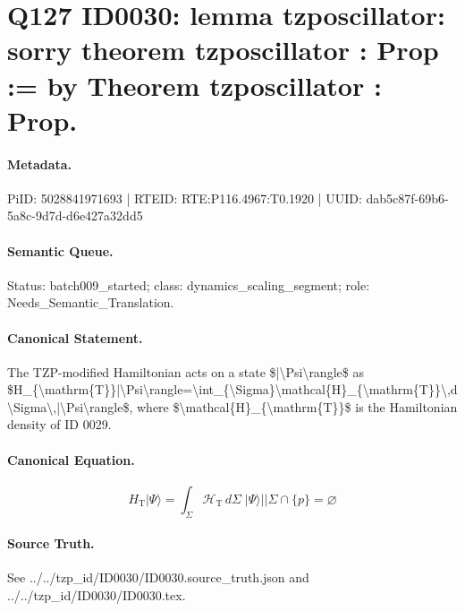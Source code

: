 \section*{Q127 ID0030: lemma tzposcillator: sorry theorem tzposcillator : Prop := by Theorem tzposcillator : Prop.}
\paragraph{Metadata.}
PiID: 5028841971693 | RTEID: RTE:P116.4967:T0.1920 | UUID: dab5c87f-69b6-5a8c-9d7d-d6e427a32dd5

\paragraph{Semantic Queue.}
Status: batch009\_started; class: dynamics\_scaling\_segment; role: Needs\_Semantic\_Translation.

\paragraph{Canonical Statement.}
The TZP-modified Hamiltonian acts on a state \$|\textbackslash{}Psi\textbackslash{}rangle\$ as \$H\_\{\textbackslash{}mathrm\{T\}\}|\textbackslash{}Psi\textbackslash{}rangle=\textbackslash{}int\_\{\textbackslash{}Sigma\}\textbackslash{}mathcal\{H\}\_\{\textbackslash{}mathrm\{T\}\}\textbackslash{},d\textbackslash{}Sigma\textbackslash{},|\textbackslash{}Psi\textbackslash{}rangle\$, where \$\textbackslash{}mathcal\{H\}\_\{\textbackslash{}mathrm\{T\}\}\$ is the Hamiltonian density of ID 0029.

\paragraph{Canonical Equation.}
\[
H_{\mathrm{T}}\lvert\Psi\rangle = \int_{\Sigma}\mathcal{H}_{\mathrm{T}}\,d\Sigma\;\lvert\Psi\rangle || \Sigma \cap \{p\} = \varnothing
\]

\paragraph{Source Truth.}
See ../../tzp\_id/ID0030/ID0030.source\_truth.json and ../../tzp\_id/ID0030/ID0030.tex.
